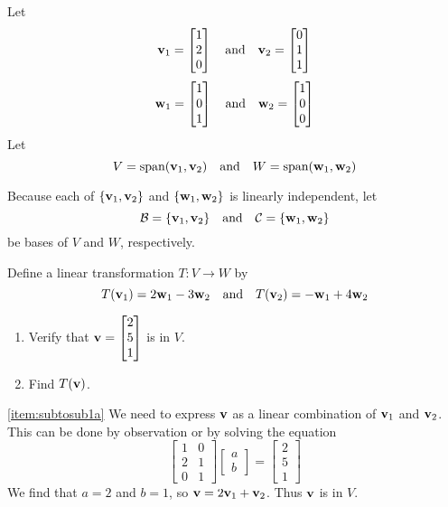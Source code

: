 \documentclass{ximera}
\renewcommand{\vec}[1]{{\bf #1}}
\begin{document}
\begin{example}\label{ex:subtosub1}
Let
$$\vec{v}_1=\begin{bmatrix}1\\2\\0\end{bmatrix}\quad\text{and}\quad\vec{v}_2=\begin{bmatrix}0\\1\\1\end{bmatrix}$$
$$\vec{w}_1=\begin{bmatrix}1\\0\\1\end{bmatrix}\quad\text{and}\quad\vec{w}_2=\begin{bmatrix}1\\0\\0\end{bmatrix}$$
Let $$V=\text{span}(\vec{v}_1, \vec{v}_2)\quad\text{and}\quad W=\text{span}(\vec{w}_1, \vec{w}_2)$$

Because each of $\{\vec{v}_1, \vec{v}_2\}$ and $\{\vec{w}_1, \vec{w}_2\}$ is linearly independent, let 
$$\mathcal{B}=\{\vec{v}_1, \vec{v}_2\}\quad\text{and}\quad\mathcal{C}=\{\vec{w}_1, \vec{w}_2\}$$
be bases of $V$ and $W$, respectively.


Define a linear transformation $T:V\rightarrow W$ by 
$$T(\vec{v}_1)=2\vec{w}_1-3\vec{w}_2\quad\text{and} \quad T(\vec{v}_2)=-\vec{w}_1+4\vec{w}_2$$

\begin{enumerate}
\item \label{item:subtosub1a}
Verify that $\vec{v}=\begin{bmatrix}2\\5\\1\end{bmatrix}$ is in $V$.
\item\label{item:subtosub1b}
Find $T(\vec{v})$.
\end{enumerate}
\begin{explanation}
\ref{item:subtosub1a} We need to express $\vec{v}$ as a linear combination of $\vec{v}_1$ and $\vec{v}_2$.  This can be done by observation or by solving the equation
$$\begin{bmatrix}1&0\\2&1\\0&1\end{bmatrix}\begin{bmatrix}a\\b\end{bmatrix}=\begin{bmatrix}2\\5\\1\end{bmatrix}$$
We find that $a=2$ and $b=1$, so $\vec{v}=2\vec{v}_1+\vec{v}_2$.  Thus $\vec{v}$ is in $V$.


\end{explanation}
\end{example}
\end{document}
